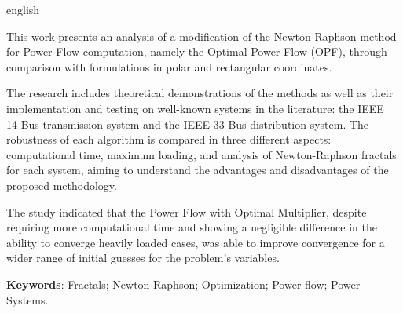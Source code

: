 \begin{otherlanguage*}{english}
\begin{resumo}
This work presents an analysis of a modification of the Newton-Raphson method for Power Flow computation, namely the Optimal Power Flow (OPF), through comparison with formulations in polar and rectangular coordinates.

The research includes theoretical demonstrations of the methods as well as their implementation and testing on well-known systems in the literature: the IEEE 14-Bus transmission system and the IEEE 33-Bus distribution system. The robustness of each algorithm is compared in three different aspects: computational time, maximum loading, and analysis of Newton-Raphson fractals for each system, aiming to understand the advantages and disadvantages of the proposed methodology.

The study indicated that the Power Flow with Optimal Multiplier, despite requiring more computational time and showing a negligible difference in the ability to converge heavily loaded cases, was able to improve convergence for a wider range of initial guesses for the problem's variables.

\textbf{Keywords}: Fractals; Newton-Raphson; Optimization; Power flow; Power Systems. 
\end{resumo}
\end{otherlanguage*}